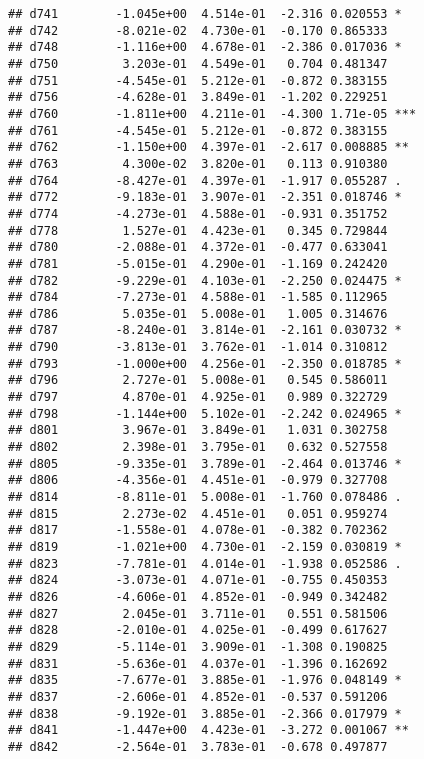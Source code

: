 \documentclass[
]{article}
\begin{document}
\begin{verbatim}
## d741        -1.045e+00  4.514e-01  -2.316 0.020553 *  
## d742        -8.021e-02  4.730e-01  -0.170 0.865333    
## d748        -1.116e+00  4.678e-01  -2.386 0.017036 *  
## d750         3.203e-01  4.549e-01   0.704 0.481347    
## d751        -4.545e-01  5.212e-01  -0.872 0.383155    
## d756        -4.628e-01  3.849e-01  -1.202 0.229251    
## d760        -1.811e+00  4.211e-01  -4.300 1.71e-05 ***
## d761        -4.545e-01  5.212e-01  -0.872 0.383155    
## d762        -1.150e+00  4.397e-01  -2.617 0.008885 ** 
## d763         4.300e-02  3.820e-01   0.113 0.910380    
## d764        -8.427e-01  4.397e-01  -1.917 0.055287 .  
## d772        -9.183e-01  3.907e-01  -2.351 0.018746 *  
## d774        -4.273e-01  4.588e-01  -0.931 0.351752    
## d778         1.527e-01  4.423e-01   0.345 0.729844    
## d780        -2.088e-01  4.372e-01  -0.477 0.633041    
## d781        -5.015e-01  4.290e-01  -1.169 0.242420    
## d782        -9.229e-01  4.103e-01  -2.250 0.024475 *  
## d784        -7.273e-01  4.588e-01  -1.585 0.112965    
## d786         5.035e-01  5.008e-01   1.005 0.314676    
## d787        -8.240e-01  3.814e-01  -2.161 0.030732 *  
## d790        -3.813e-01  3.762e-01  -1.014 0.310812    
## d793        -1.000e+00  4.256e-01  -2.350 0.018785 *  
## d796         2.727e-01  5.008e-01   0.545 0.586011    
## d797         4.870e-01  4.925e-01   0.989 0.322729    
## d798        -1.144e+00  5.102e-01  -2.242 0.024965 *  
## d801         3.967e-01  3.849e-01   1.031 0.302758    
## d802         2.398e-01  3.795e-01   0.632 0.527558    
## d805        -9.335e-01  3.789e-01  -2.464 0.013746 *  
## d806        -4.356e-01  4.451e-01  -0.979 0.327708    
## d814        -8.811e-01  5.008e-01  -1.760 0.078486 .  
## d815         2.273e-02  4.451e-01   0.051 0.959274    
## d817        -1.558e-01  4.078e-01  -0.382 0.702362    
## d819        -1.021e+00  4.730e-01  -2.159 0.030819 *  
## d823        -7.781e-01  4.014e-01  -1.938 0.052586 .  
## d824        -3.073e-01  4.071e-01  -0.755 0.450353    
## d826        -4.606e-01  4.852e-01  -0.949 0.342482    
## d827         2.045e-01  3.711e-01   0.551 0.581506    
## d828        -2.010e-01  4.025e-01  -0.499 0.617627    
## d829        -5.114e-01  3.909e-01  -1.308 0.190825    
## d831        -5.636e-01  4.037e-01  -1.396 0.162692    
## d835        -7.677e-01  3.885e-01  -1.976 0.048149 *  
## d837        -2.606e-01  4.852e-01  -0.537 0.591206    
## d838        -9.192e-01  3.885e-01  -2.366 0.017979 *  
## d841        -1.447e+00  4.423e-01  -3.272 0.001067 ** 
## d842        -2.564e-01  3.783e-01  -0.678 0.497877    

\end{verbatim}
\end{document}
